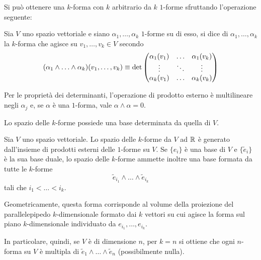 Si può ottenere una $k$-forma con $k$ arbitrario da $k$ $1$-forme sfruttando l'operazione seguente:
\begin{definition}
  Sia $V$ uno spazio vettoriale e siano $\alpha_1, \ldots, \alpha_k$ $1$-forme su di esso, si dice  di $\alpha_1, \ldots, \alpha_k$ la $k$-forma che agisce su $v_1, \ldots, v_k \in V$ secondo \begin{equation*}
  (\alpha_1 \wedge \ldots \wedge \alpha_k) (v_1, \ldots, v_k) \defeq \det \pmqty{\alpha_1 (v_1) & \ldots & \alpha_1 (v_k) \\
          \vdots & \ddots & \vdots \\
          \alpha_k (v_1) & \ldots & \alpha_k (v_k)}
  \end{equation*} 
\end{definition}
\begin{remark}
  Per le proprietà dei determinanti, l'operazione di prodotto esterno è multilineare negli $\alpha_j$ e, se $\alpha$ è una $1$-forma, vale $\alpha \wedge \alpha = 0$.
\end{remark}

Lo spazio delle $k$-forme possiede una base determinata da quella di $V$.
\begin{theorem} \label{thm:kformBase}
  Sia $V$ uno spazio vettoriale. Lo spazio delle $k$-forme da $V$ ad $\mathbb{R}$ è generato dall'insieme di prodotti esterni delle $1$-forme su $V$. Se $\{e_i\} $ è una base di $V$ e $\{\tilde{e}_i\} $ è la sua base duale, lo spazio delle $k$-forme ammette inoltre una base formata da tutte le $k$-forme \begin{equation*}
    \tilde{e}_{i_1} \wedge \ldots \wedge \tilde{e}_{i_k}
  \end{equation*}
  tali che $i_1 < \ldots < i_k$.
\end{theorem}
\begin{remark}
  Geometricamente, questa forma corrisponde al volume della proiezione del parallelepipedo $k$-dimensionale formato dai $k$ vettori su cui agisce la forma sul piano $k$-dimensionale individuato da $e_{i_1},\ldots,e_{i_k}$.
\end{remark}
\begin{remark} \label{rem:volumeForm}
  In particolare, quindi, se $V$ è di dimensione $n$, per $k=n$ si ottiene che ogni $n$-forma su $V$ è multipla di $\tilde{e}_1 \wedge \ldots \wedge \tilde{e}_n$ (possibilmente nulla).
\end{remark}

